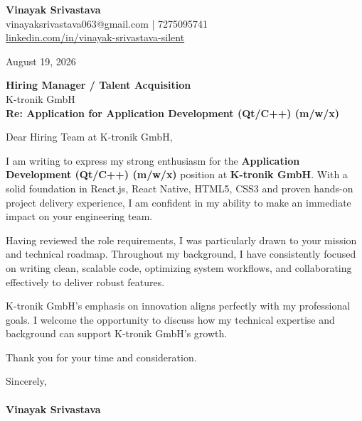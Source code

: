 \documentclass[11pt,a4paper]{article}
\begin{document}
\thispagestyle{empty}

{\Large \textbf{Vinayak Srivastava}}\\
vinayaksrivastava063@gmail.com | 7275095741 \\
\url{linkedin.com/in/vinayak-srivastava-silent}

\vspace{1em}
\hfill August 19, 2026

\textbf{Hiring Manager / Talent Acquisition}\\
K-tronik GmbH\\

\vspace{1.5em}
\textbf{Re: Application for Application Development (Qt/C++) (m/w/x)}

\vspace{1em}
Dear Hiring Team at K-tronik GmbH,

I am writing to express my strong enthusiasm for the \textbf{Application Development (Qt/C++) (m/w/x)} position at \textbf{K-tronik GmbH}. With a solid foundation in React.js, React Native, HTML5, CSS3 and proven hands-on project delivery experience, I am confident in my ability to make an immediate impact on your engineering team.

Having reviewed the role requirements, I was particularly drawn to your mission and technical roadmap. Throughout my background, I have consistently focused on writing clean, scalable code, optimizing system workflows, and collaborating effectively to deliver robust features.

K-tronik GmbH's emphasis on innovation aligns perfectly with my professional goals. I welcome the opportunity to discuss how my technical expertise and background can support K-tronik GmbH's growth.

Thank you for your time and consideration.

\vspace{1.5em}
Sincerely,\\
\vspace{1em}\\
\textbf{Vinayak Srivastava}
\end{document}
